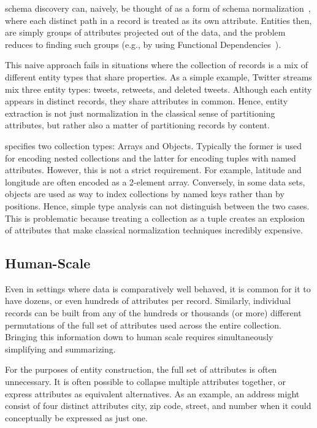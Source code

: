 \json schema discovery can, naively, be thought of as a form of schema normalization~\cite{Codd:1979:EDR:320107.320109}, where each distinct path in a record is treated as its own attribute.
Entities then, are simply groups of attributes projected out of the \json data, and 
the \sssd problem reduces to finding such groups (e.g., by using Functional Dependencies~\cite{DBLP:conf/sigmod/DiScalaA16}).  

This naive approach fails in situations where the collection of \json records is a mix of different entity types that share properties.
As a simple example, Twitter streams mix three entity types: tweets, retweets, and deleted tweets.  
Although each entity appears in distinct records, they share attributes in common.
Hence, entity extraction is not just normalization in the classical sense of partitioning attributes, but rather also a matter of partitioning records by content.

\json specifies two collection types: Arrays and Objects.  
Typically the former is used for encoding nested collections and the latter for encoding tuples with named attributes.
However, this is not a strict requirement.
For example, latitude and longitude are often encoded as a 2-element array.
Conversely, in some data sets, objects are used as way to index collections by named keys rather than by positions.
Hence, simple type analysis can not distinguish between the two cases.
This is problematic because treating a collection as a tuple creates an explosion of attributes that make classical normalization techniques incredibly expensive.

\subsection{Human-Scale \sssd}
Even in settings where \json data is comparatively well behaved, it is common for it to have dozens, or even hundreds of attributes per record.  
Similarly, individual \json records can be built from any of the hundreds or thousands (or more) different permutations of the full set of attributes used across the entire collection.
Bringing this information down to human scale requires simultaneously simplifying and summarizing.

For the purposes of entity construction, the full set of attributes is often unnecessary.
It is often possible to collapse multiple attributes together, or express attributes as equivalent alternatives.
As an example, an address might consist of four distinct attributes city, zip code, street, and number when it could conceptually be expressed as just one.

